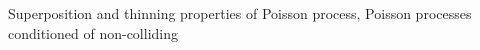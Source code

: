 Superposition and thinning properties of Poisson process, Poisson processes conditioned of non-colliding